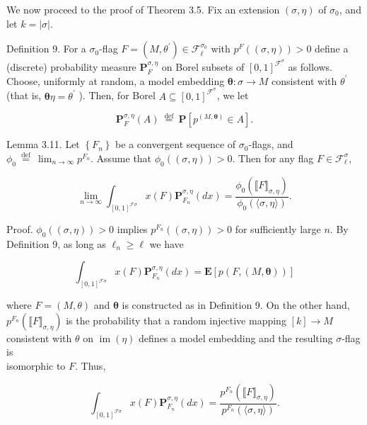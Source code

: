 \documentclass[10pt]{article}
\begin{document}
We now proceed to the proof of Theorem 3.5. Fix an extension $(\sigma, \eta)$ of $\sigma_{0}$, and let $k=|\sigma|$.

Definition 9. For a $\sigma_{0}$-flag $F=\left(M, \theta^{\prime}\right) \in \mathcal{F}_{\ell}^{\sigma_{0}}$ with $p^{F}((\sigma, \eta))>0$ define a (discrete) probability measure $\mathbf{P}_{F}^{\sigma, \eta}$ on Borel subsets of $[0,1]^{\mathcal{F}^{\sigma}}$ as follows. Choose, uniformly at random, a model embedding $\boldsymbol{\theta}: \sigma \longrightarrow M$ consistent with $\theta^{\prime}$ (that is, $\boldsymbol{\theta} \eta=\theta^{\prime}$ ). Then, for Borel $A \subseteq[0,1]^{\mathcal{F}^{\sigma}}$, we let

$$
\mathbf{P}_{F}^{\sigma, \eta}(A) \stackrel{\text { def }}{=} \mathbf{P}\left[p^{(M, \boldsymbol{\theta})} \in A\right] .
$$

Lemma 3.11. Let $\left\{F_{n}\right\}$ be a convergent sequence of $\sigma_{0}$-flags, and $\phi_{0} \stackrel{\text { def }}{=} \lim _{n \rightarrow \infty} p^{F_{n}}$. Assume that $\phi_{0}((\sigma, \eta))>0$. Then for any flag $F \in \mathcal{F}_{\ell}^{\sigma}$,

$$
\lim _{n \rightarrow \infty} \int_{[0,1]^{\mathcal{F} \sigma}} x(F) \mathbf{P}_{F_{n}}^{\sigma, \eta}(d x)=\frac{\phi_{0}\left(\llbracket F \rrbracket_{\sigma, \eta}\right)}{\phi_{0}(\langle\sigma, \eta\rangle)} .
$$

Proof. $\phi_{0}((\sigma, \eta))>0$ implies $p^{F_{n}}((\sigma, \eta))>0$ for sufficiently large $n$. By Definition 9, as long as $\ell_{n} \geq \ell$ we have


\begin{equation*}
\int_{[0,1]^{\mathcal{F} \sigma}} x(F) \mathbf{P}_{F_{n}}^{\sigma, \eta}(d x)=\mathbf{E}[p(F,(M, \boldsymbol{\theta}))] \tag{18}
\end{equation*}


where $F=(M, \theta)$ and $\boldsymbol{\theta}$ is constructed as in Definition 9. On the other hand, $p^{F_{n}}\left(\llbracket F \rrbracket_{\sigma, \eta}\right)$ is the probability that a random injective mapping $[k] \longrightarrow M$ consistent with $\theta$ on $\operatorname{im}(\eta)$ defines a model embedding and the resulting $\sigma$-flag is\\
isomorphic to $F$. Thus,


\begin{equation*}
\int_{[0,1]^{\mathcal{F} \sigma}} x(F) \mathbf{P}_{F_{n}}^{\sigma, \eta}(d x)=\frac{p^{F_{n}}\left(\llbracket F \rrbracket_{\sigma, \eta}\right)}{p^{F_{n}}(\langle\sigma, \eta\rangle)} . \tag{19}
\end{equation*}
\end{document}
